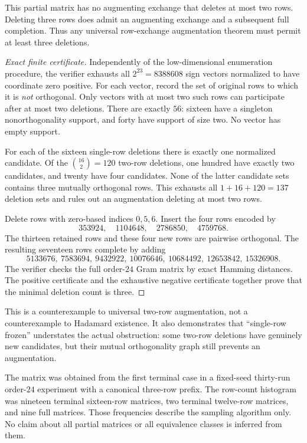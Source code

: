 \begin{proposition}
This partial matrix has no augmenting exchange that deletes at most
two rows. Deleting three rows does admit an augmenting exchange and
a subsequent full completion. Thus any universal row-exchange
augmentation theorem must permit at least three deletions.
\end{proposition}
\begin{proof}[Exact finite certificate]
Independently of the low-dimensional enumeration procedure, the
verifier exhausts all $2^{23}=8388608$ sign vectors normalized to have
coordinate zero positive. For each vector, record the set of original
rows to which it is \emph{not} orthogonal. Only vectors with at most
two such rows can participate after at most two deletions. There are
exactly $56$: sixteen have a singleton nonorthogonality support, and
forty have support of size two. No vector has empty support.

For each of the sixteen single-row deletions there is exactly one
normalized candidate. Of the $\binom{16}{2}=120$ two-row deletions,
one hundred have exactly two candidates, and twenty have four
candidates. None of the latter candidate sets contains three mutually
orthogonal rows. This exhausts all $1+16+120=137$ deletion sets and
rules out an augmentation deleting at most two rows.

Delete rows with zero-based indices $0,5,6$. Insert the four rows
encoded by
\[
 353924,\quad1104648,\quad2786850,\quad4759768.
\]
The thirteen retained rows and these four new rows are pairwise
orthogonal. The resulting seventeen rows complete by adding
\[
 5133676,\ 7583694,\ 9432922,\ 10076646,\ 10684492,\ 12653842,\ 15326908.
\]
The verifier checks the full order-$24$ Gram matrix by exact Hamming
distances. The positive certificate and the exhaustive negative
certificate together prove that the minimal deletion count is three.
\end{proof}

This is a counterexample to universal two-row augmentation, not a
counterexample to Hadamard existence. It also demonstrates that
``single-row frozen'' understates the actual obstruction: some
two-row deletions have genuinely new candidates, but their mutual
orthogonality graph still prevents an augmentation.

The matrix was obtained from the first terminal case in a fixed-seed
thirty-run order-$24$ experiment with a canonical three-row prefix.
The row-count histogram was nineteen terminal sixteen-row matrices,
two terminal twelve-row matrices, and nine full matrices. Those
frequencies describe the sampling algorithm only. No claim about all
partial matrices or all equivalence classes is inferred from them.

